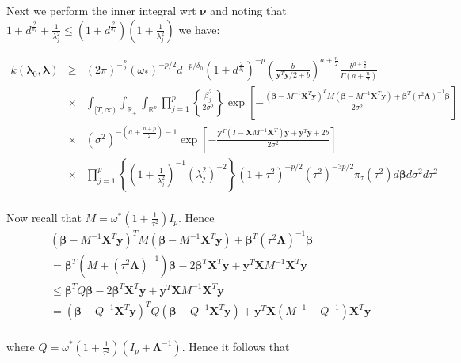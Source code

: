\documentclass[noinfoline,11pt]{imsart}
\numberwithin{equation}{section}
\theoremstyle{plain}
\newcommand{\y}{\mathbf{y}}
\newcommand{\X}{\mathbf{X}}
\newcommand{\bl}{\boldsymbol{\lambda}}
\newcommand{\Bl}{\boldsymbol{\Lambda}}
\begin{document}
\noindent
Next we perform the inner integral wrt $\boldsymbol \nu$ and noting that $1+d^{\frac{2}{\delta_1}}+\frac{1}{\lambda_j^2}\leq \left(1+d^{\frac{2}{\delta_1}}\right)\left(1+\frac{1}{\lambda_j^2}\right)$ we have:

\begin{eqnarray*}
k\left(\bl_0,\bl\right) &\geq& \left(2\pi\right)^{-\frac{p}{2}}\left(\omega_*\right)^{-p/2}d^{-p/\delta_0}\left(1+d^{\frac{2}{\delta_1}}\right)^{-p}\left(\frac{b}{\y^T\y/2+b}\right)^{a+\frac{n}{2}}\frac{b^{a+\frac{n}{2}}}{\Gamma\left(a+\frac{n}{2}\right)} \nonumber \\
&\times& \int_{[T,\infty)}\int_{\mathbb{R}_+}\int_{\mathbb{R}^p}\prod_{j=1}^p\left\{\frac{\beta_j^2}{2\sigma^2}\right\}\exp{\left[-\frac{\left(\boldsymbol{\beta}-M^{-1}\X^T\y\right)^T M\left(\boldsymbol{\beta}-M^{-1}\X^T\y\right)+\boldsymbol{\beta}^T\left(\tau^2\Bl\right)^{-1}\boldsymbol{\beta}}{2\sigma^2}\right]}\nonumber \\
&\times& \left(\sigma^2\right)^{-\left(a+\frac{n+p}{2}\right)-1}\exp{\left[-\frac{\y^T\left(I-\X M^{-1}\X^T\right)\y+\y^T\y+2b}{2\sigma^2}\right]} \nonumber \\
&\times& \prod_{j=1}^p\left\{\left(1+\frac{1}{\lambda_j^2}\right)^{-1}\left(\lambda_j^2\right)^{-2}\right\}\left(1+\tau^2\right)^{-p/2}\left(\tau^2\right)^{-3p/2}\pi_\tau\left(\tau^2\right)d\boldsymbol{\beta}d\sigma^2d\tau^2\nonumber \\
\end{eqnarray*}

\noindent
Now recall that $M=\omega^*\left(1+\frac{1}{\tau^2}\right)I_p$. Hence 
\begin{eqnarray*}
& \left(\boldsymbol{\beta}-M^{-1}\X^T\y\right)^T M\left(\boldsymbol{\beta}-M^{-1}\X^T\y\right)+\boldsymbol{\beta}^T\left(\tau^2\Bl\right)^{-1}\boldsymbol{\beta} \\
&= \boldsymbol{\beta}^T\left(M+\left(\tau^2\Bl\right)^{-1}\right)\boldsymbol{\beta}-2\boldsymbol{\beta}^T\X^T\y+\y^T\X M^{-1}\X^T\y\nonumber \\
&\leq \boldsymbol{\beta}^T Q\boldsymbol{\beta}-2\boldsymbol{\beta}^T\X^T\y+\y^T\X M^{-1}\X^T\y\nonumber \\
&= \left(\boldsymbol{\beta}-Q^{-1}\X^T\y\right)^T Q\left(\boldsymbol{\beta}-Q^{-1}\X^T\y\right)+\y^T\X\left(M^{-1}- Q^{-1}\right)\X^T\y\nonumber \\
\end{eqnarray*}

\noindent

where $Q=\omega^*\left(1+\frac{1}{\tau^2}\right)\left(I_p+\Bl^{-1}\right).$ Hence it follows that
\end{document}
